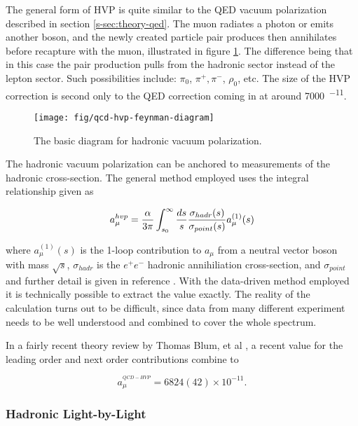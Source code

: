 The general form of HVP is quite similar to the QED vacuum polarization described in section \ref{s-sec:theory-qed}.  The muon radiates a photon or emits another boson, and the newly created particle pair produces then annihilates before recapture with the muon, illustrated in figure \ref{fig:qcd-hvp-feynman-diagram}.  The difference being that in this case the pair production pulls from the hadronic sector instead of the lepton sector.  Such possibilities include: $\pi_0$, $\pi^+, \pi^-$, $\rho_0$, etc.  The size of the HVP correction is second only to the QED correction coming in at around \SI{7000}{^{-11}}.

\begin{figure}
\centering
\texttt{[image: fig/qcd-hvp-feynman-diagram]}
\caption{The basic diagram for hadronic vacuum polarization. \label{fig:qcd-hvp-feynman-diagram}}
\end{figure}

The hadronic vacuum polarization can be anchored to measurements of the hadronic cross-section.  The general method employed uses the integral relationship given as

\begin{equation}
\label{eqn:qcd-hvp-integral}
a_\mu^{hvp} = \frac{\alpha}{3\pi} \int_{s_0}^{\infty} \frac{ds}{s} \\
\frac{\sigma_{hadr}(s)}{\sigma_{point}(s)} a_\mu^{(1)}(s)
\end{equation}

\noindent
where $a_\mu^{(1)}(s)$ is the 1-loop contribution to $a_\mu$ from a neutral vector boson with mass $\sqrt{s}$, $\sigma_{hadr}$ is the $e^+e^-$ hadronic annihiliation cross-section, and $\sigma_{point}$ and further detail is given in reference \cite{amm-of-muon}.  With the data-driven method employed it is technically possible to extract the value exactly.  The reality of the calculation turns out to be difficult, since data from many different experiment needs to be well understood and combined to cover the whole spectrum.  

In a fairly recent theory review by Thomas Blum, et al \cite{muon-g-2-blum}, a recent value for the leading order and next order contributions combine to 

\begin{equation}
\label{eqn:qcd-hvp-total}
a_\mu^{^{QCD-HVP}} = 6824(42) \times 10^{-11}.
\end{equation}

\subsubsection{Hadronic Light-by-Light}

